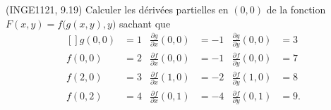 
\begin{exercice}\label{exoFoncDeuxVar0020}

	(INGE1121, 9.19) Calculer les dérivées partielles en $(0,0)$ de la fonction $F(x,y)=f\big( g(x,y),y \big)$ sachant que
	\begin{equation}
		\begin{aligned}[]
			g(0,0)&=1	& \frac{ \partial g }{ \partial x }(0,0)&=-1	&	\frac{ \partial g }{ \partial y }(0,0)&=3\\
			f(0,0)&=2	& \frac{ \partial f }{ \partial x }(0,0)&=-1	&	\frac{ \partial f }{ \partial y }(0,0)&=7\\
			f(2,0)&=3	& \frac{ \partial f }{ \partial x }(1,0)&=-2	&	\frac{ \partial f }{ \partial y }(1,0)&=8\\
			f(0,2)&=4	& \frac{ \partial f }{ \partial x }(0,1)&=-4	&	\frac{ \partial f }{ \partial y }(0,1)&=9.
		\end{aligned}
	\end{equation}

\end{exercice}
